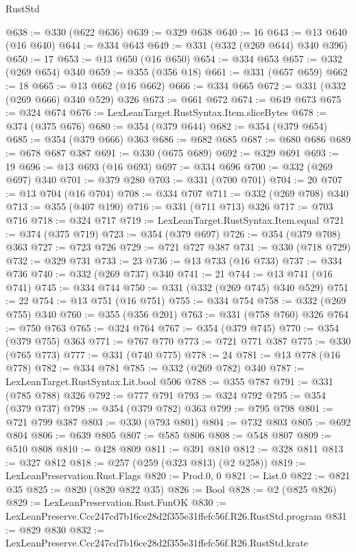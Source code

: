 \begin{lexlean}{RustStd}
\begin{coremodule}
@638 := @330 (@622 @636)
@639 := @329 @638
@640 := 16
@643 := @13 @640 (@16 @640)
@644 := @334 @643
@649 := @331 (@332 (@269 @644) @340 @396)
@650 := 17
@653 := @13 @650 (@16 @650)
@654 := @334 @653
@657 := @332 (@269 @654) @340
@659 := @355 (@356 @18)
@661 := @331 (@657 @659)
@662 := 18
@665 := @13 @662 (@16 @662)
@666 := @334 @665
@672 := @331 (@332 (@269 @666) @340 @529) @326
@673 := @661 @672
@674 := @649 @673
@675 := @324 @674
@676 := LexLeanTarget.RustSyntax.Item.sliceBytes
@678 := @374 (@375 @676)
@680 := @354 (@379 @644)
@682 := @354 (@379 @654)
@685 := @354 (@379 @666) @363
@686 := @682 @685
@687 := @680 @686
@689 := @678 @687 @387
@691 := @330 (@675 @689)
@692 := @329 @691
@693 := 19
@696 := @13 @693 (@16 @693)
@697 := @334 @696
@700 := @332 (@269 @697) @340
@701 := @379 @280
@703 := @331 (@700 @701)
@704 := 20
@707 := @13 @704 (@16 @704)
@708 := @334 @707
@711 := @332 (@269 @708) @340
@713 := @355 (@407 @190)
@716 := @331 (@711 @713) @326
@717 := @703 @716
@718 := @324 @717
@719 := LexLeanTarget.RustSyntax.Item.equal
@721 := @374 (@375 @719)
@723 := @354 (@379 @697)
@726 := @354 (@379 @708) @363
@727 := @723 @726
@729 := @721 @727 @387
@731 := @330 (@718 @729)
@732 := @329 @731
@733 := 23
@736 := @13 @733 (@16 @733)
@737 := @334 @736
@740 := @332 (@269 @737) @340
@741 := 21
@744 := @13 @741 (@16 @741)
@745 := @334 @744
@750 := @331 (@332 (@269 @745) @340 @529)
@751 := 22
@754 := @13 @751 (@16 @751)
@755 := @334 @754
@758 := @332 (@269 @755) @340
@760 := @355 (@356 @201)
@763 := @331 (@758 @760) @326
@764 := @750 @763
@765 := @324 @764
@767 := @354 (@379 @745)
@770 := @354 (@379 @755) @363
@771 := @767 @770
@773 := @721 @771 @387
@775 := @330 (@765 @773)
@777 := @331 (@740 @775)
@778 := 24
@781 := @13 @778 (@16 @778)
@782 := @334 @781
@785 := @332 (@269 @782) @340
@787 := LexLeanTarget.RustSyntax.Lit.bool @506
@788 := @355 @787
@791 := @331 (@785 @788) @326
@792 := @777 @791
@793 := @324 @792
@795 := @354 (@379 @737)
@798 := @354 (@379 @782) @363
@799 := @795 @798
@801 := @721 @799 @387
@803 := @330 (@793 @801)
@804 := @732 @803
@805 := @692 @804
@806 := @639 @805
@807 := @585 @806
@808 := @548 @807
@809 := @510 @808
@810 := @428 @809
@811 := @391 @810
@812 := @328 @811
@813 := @327 @812
@818 := @257 (@259 (@323 @813) (@2 @258))
@819 := LexLeanPreservation.Rust.Flags
@820 := Prod.{0, 0}
@821 := List.{0}
@822 := @821 @35
@825 := @820 (@820 @822 @35)
@826 := Bool
@828 := @2 (@825 @826)
@829 := LexLeanPreservation.Rust.FunOK
@830 := LexLeanPreserve.Ccc247cd7b16ce28d2f355e31ffefc56f.R26.RustStd.program
@831 := @829 @830
@832 := LexLeanPreserve.Ccc247cd7b16ce28d2f355e31ffefc56f.R26.RustStd.krate

\end{coremodule}
\end{lexlean}
